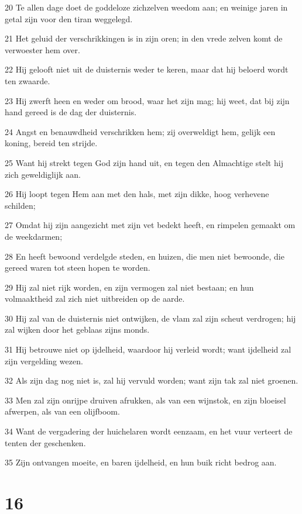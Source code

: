 \par 20 Te allen dage doet de goddeloze zichzelven weedom aan; en weinige jaren in getal zijn voor den tiran weggelegd.
\par 21 Het geluid der verschrikkingen is in zijn oren; in den vrede zelven komt de verwoester hem over.
\par 22 Hij gelooft niet uit de duisternis weder te keren, maar dat hij beloerd wordt ten zwaarde.
\par 23 Hij zwerft heen en weder om brood, waar het zijn mag; hij weet, dat bij zijn hand gereed is de dag der duisternis.
\par 24 Angst en benauwdheid verschrikken hem; zij overweldigt hem, gelijk een koning, bereid ten strijde.
\par 25 Want hij strekt tegen God zijn hand uit, en tegen den Almachtige stelt hij zich geweldiglijk aan.
\par 26 Hij loopt tegen Hem aan met den hals, met zijn dikke, hoog verhevene schilden;
\par 27 Omdat hij zijn aangezicht met zijn vet bedekt heeft, en rimpelen gemaakt om de weekdarmen;
\par 28 En heeft bewoond verdelgde steden, en huizen, die men niet bewoonde, die gereed waren tot steen hopen te worden.
\par 29 Hij zal niet rijk worden, en zijn vermogen zal niet bestaan; en hun volmaaktheid zal zich niet uitbreiden op de aarde.
\par 30 Hij zal van de duisternis niet ontwijken, de vlam zal zijn scheut verdrogen; hij zal wijken door het geblaas zijns monds.
\par 31 Hij betrouwe niet op ijdelheid, waardoor hij verleid wordt; want ijdelheid zal zijn vergelding wezen.
\par 32 Als zijn dag nog niet is, zal hij vervuld worden; want zijn tak zal niet groenen.
\par 33 Men zal zijn onrijpe druiven afrukken, als van een wijnstok, en zijn bloeisel afwerpen, als van een olijfboom.
\par 34 Want de vergadering der huichelaren wordt eenzaam, en het vuur verteert de tenten der geschenken.
\par 35 Zijn ontvangen moeite, en baren ijdelheid, en hun buik richt bedrog aan.

\chapter{16}

